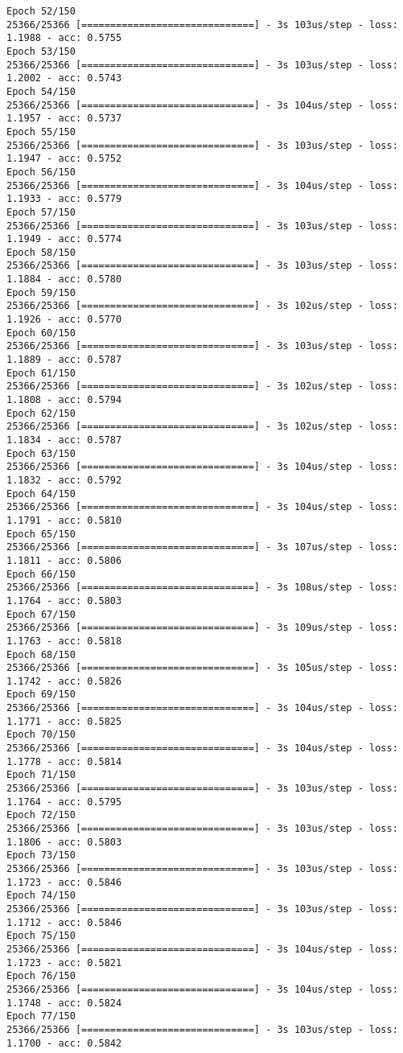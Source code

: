 \documentclass[11pt]{article}
\begin{document}
\begin{Verbatim}[commandchars=\\\{\}]
Epoch 52/150
25366/25366 [==============================] - 3s 103us/step - loss: 1.1988 - acc: 0.5755
Epoch 53/150
25366/25366 [==============================] - 3s 103us/step - loss: 1.2002 - acc: 0.5743
Epoch 54/150
25366/25366 [==============================] - 3s 104us/step - loss: 1.1957 - acc: 0.5737
Epoch 55/150
25366/25366 [==============================] - 3s 103us/step - loss: 1.1947 - acc: 0.5752
Epoch 56/150
25366/25366 [==============================] - 3s 104us/step - loss: 1.1933 - acc: 0.5779
Epoch 57/150
25366/25366 [==============================] - 3s 103us/step - loss: 1.1949 - acc: 0.5774
Epoch 58/150
25366/25366 [==============================] - 3s 103us/step - loss: 1.1884 - acc: 0.5780
Epoch 59/150
25366/25366 [==============================] - 3s 102us/step - loss: 1.1926 - acc: 0.5770
Epoch 60/150
25366/25366 [==============================] - 3s 103us/step - loss: 1.1889 - acc: 0.5787
Epoch 61/150
25366/25366 [==============================] - 3s 102us/step - loss: 1.1808 - acc: 0.5794
Epoch 62/150
25366/25366 [==============================] - 3s 102us/step - loss: 1.1834 - acc: 0.5787
Epoch 63/150
25366/25366 [==============================] - 3s 104us/step - loss: 1.1832 - acc: 0.5792
Epoch 64/150
25366/25366 [==============================] - 3s 104us/step - loss: 1.1791 - acc: 0.5810
Epoch 65/150
25366/25366 [==============================] - 3s 107us/step - loss: 1.1811 - acc: 0.5806
Epoch 66/150
25366/25366 [==============================] - 3s 108us/step - loss: 1.1764 - acc: 0.5803
Epoch 67/150
25366/25366 [==============================] - 3s 109us/step - loss: 1.1763 - acc: 0.5818
Epoch 68/150
25366/25366 [==============================] - 3s 105us/step - loss: 1.1742 - acc: 0.5826
Epoch 69/150
25366/25366 [==============================] - 3s 104us/step - loss: 1.1771 - acc: 0.5825
Epoch 70/150
25366/25366 [==============================] - 3s 104us/step - loss: 1.1778 - acc: 0.5814
Epoch 71/150
25366/25366 [==============================] - 3s 103us/step - loss: 1.1764 - acc: 0.5795
Epoch 72/150
25366/25366 [==============================] - 3s 103us/step - loss: 1.1806 - acc: 0.5803
Epoch 73/150
25366/25366 [==============================] - 3s 103us/step - loss: 1.1723 - acc: 0.5846
Epoch 74/150
25366/25366 [==============================] - 3s 103us/step - loss: 1.1712 - acc: 0.5846
Epoch 75/150
25366/25366 [==============================] - 3s 104us/step - loss: 1.1723 - acc: 0.5821
Epoch 76/150
25366/25366 [==============================] - 3s 104us/step - loss: 1.1748 - acc: 0.5824
Epoch 77/150
25366/25366 [==============================] - 3s 103us/step - loss: 1.1700 - acc: 0.5842

\end{Verbatim}
\end{document}
